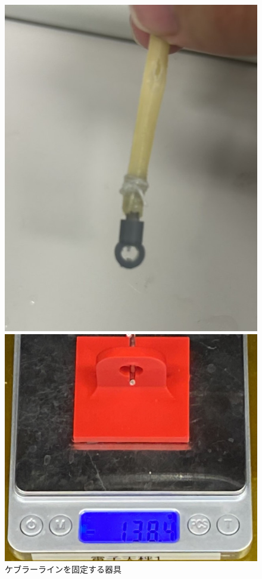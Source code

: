 \begin{figure}[h]
  \begin{minipage}{0.49\columnwidth}
    \vspace{4mm}
    \centering
    \includegraphics[scale=0.2]{pic/gg.jpg}
    \caption{ケブラーラインを固定する器具}
    \label{fig:new}
  \end{minipage}
  \begin{minipage}{0.49\columnwidth}
    \vspace{4mm}
    \centering
    \includegraphics[scale=0.1]{pic/qqqq.jpg}

\end{minipage}
\end{figure}
